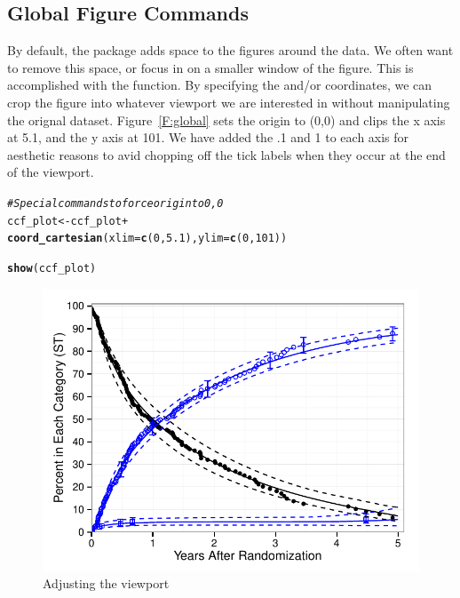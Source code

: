 \documentclass[nojss, letterpaper]{jss}\usepackage[]{graphicx}\usepackage[]{color}
\makeatletter
\def\maxwidth{ %
  \ifdim\Gin@nat@width>\linewidth
    \linewidth
  \else
    \Gin@nat@width
  \fi
}
\newcommand{\hlnum}[1]{\textcolor[rgb]{0.686,0.059,0.569}{#1}}%
\newcommand{\hlcom}[1]{\textcolor[rgb]{0.678,0.584,0.686}{\textit{#1}}}%
\newcommand{\hlopt}[1]{\textcolor[rgb]{0,0,0}{#1}}%
\newcommand{\hlstd}[1]{\textcolor[rgb]{0.345,0.345,0.345}{#1}}%
\newcommand{\hlkwb}[1]{\textcolor[rgb]{0.69,0.353,0.396}{#1}}%
\newcommand{\hlkwc}[1]{\textcolor[rgb]{0.333,0.667,0.333}{#1}}%
\newcommand{\hlkwd}[1]{\textcolor[rgb]{0.737,0.353,0.396}{\textbf{#1}}}%
\newenvironment{kframe}{%
 \def\at@end@of@kframe{}%
 \ifinner\ifhmode%
  \def\at@end@of@kframe{\end{minipage}}%
  \begin{minipage}{\columnwidth}%
 \fi\fi%
 \def\FrameCommand##1{\hskip\@totalleftmargin \hskip-\fboxsep
 \colorbox{shadecolor}{##1}\hskip-\fboxsep
     \hskip-\linewidth \hskip-\@totalleftmargin \hskip\columnwidth}%
 \MakeFramed {\advance\hsize-\width
   \@totalleftmargin\z@ \linewidth\hsize
   \@setminipage}}%
 {\par\unskip\endMakeFramed%
 \at@end@of@kframe}
\newenvironment{knitrout}{}{} %
\makeatother
\begin{document}
\subsection{Global Figure Commands}\label{S:globals}
By default, the  package adds space to the figures around the data. We often want to remove this space, or focus in on a smaller window of the figure. This is accomplished with the  function. By specifying the  and/or  coordinates, we can crop the figure into whatever viewport we are interested in without manipulating the orignal dataset. Figure~\ref{F:global} sets the origin to (0,0) and clips the x axis at 5.1, and the y axis at 101. We have added the .1 and 1 to each axis for aesthetic reasons to avid chopping off the tick labels when they occur at the end of the viewport.
\begin{knitrout}\footnotesize
{}\color{fgcolor}\begin{kframe}
\begin{alltt}
\hlcom{# Special commands to force origin to 0,0}
\hlstd{ccf_plot} \hlkwb{<-} \hlstd{ccf_plot} \hlopt{+}
  \hlkwd{coord_cartesian}\hlstd{(}\hlkwc{xlim}\hlstd{=}\hlkwd{c}\hlstd{(}\hlnum{0}\hlstd{,}\hlnum{5.1}\hlstd{),} \hlkwc{ylim}\hlstd{=}\hlkwd{c}\hlstd{(}\hlnum{0}\hlstd{,}\hlnum{101}\hlstd{))}

\hlkwd{show}\hlstd{(ccf_plot)}
\end{alltt}
\end{kframe}\begin{figure}[htpb]


{\centering \includegraphics[width=\maxwidth]{figure/beamer-global_} 

}

\caption[Adjusting the viewport]{Adjusting the viewport\label{F:global,}}
\end{figure}


\end{knitrout}
\end{document}
